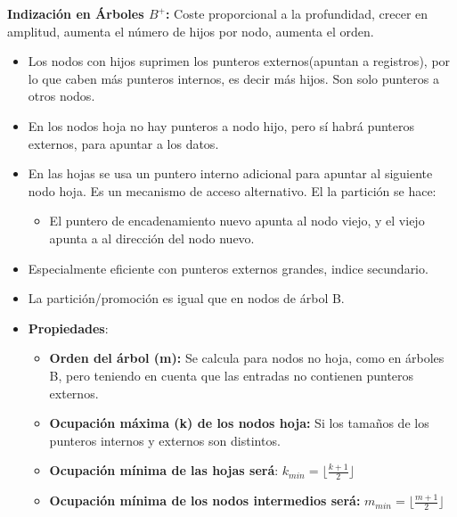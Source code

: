 \documentclass[12pt, twoside, openright]{report} %
\begin{document}
  
  \textbf{Indización en Árboles $B^+$:} Coste proporcional a la
  profundidad, crecer en amplitud, aumenta el número de hijos por nodo,
  aumenta el orden.
  

  \begin{itemize}
  \item Los nodos con hijos suprimen los punteros externos(apuntan a
    registros), por lo que caben más punteros internos, es decir más
    hijos. Son solo punteros a otros nodos.
    
  \item En los nodos hoja no hay punteros a nodo hijo, pero sí habrá
    punteros externos, para apuntar a los datos.
    
  \item En las hojas se usa un puntero interno adicional para apuntar al
    siguiente nodo hoja. Es un mecanismo de acceso alternativo. El la
    partición se hace:
    

    \begin{itemize}
    \item El puntero de encadenamiento nuevo apunta al nodo viejo, y el
      viejo apunta a al dirección del nodo nuevo.
      
    \end{itemize}
  \item Especialmente eficiente con punteros externos grandes, indice
    secundario.
    
  \item La partición/promoción es igual que en nodos de árbol B.
    
  \item \textbf{Propiedades}:
    

    \begin{itemize}
    \item \textbf{Orden del árbol (m):} Se calcula para nodos no hoja, como
      en árboles B, pero teniendo en cuenta que las entradas no
      contienen punteros externos.
      
    \item \textbf{Ocupación máxima (k) de los nodos hoja:} Si los tamaños de
      los punteros internos y externos son distintos.
      
    \item \textbf{Ocupación mínima de las hojas será}: $k_{min} = \lfloor \frac{k+1}{2} \rfloor$
      
    \item \textbf{Ocupación mínima de los nodos intermedios será:} $m_{min} = \lfloor \frac{m+1}{2} \rfloor$
      

\end{itemize}
\end{itemize}
\end{document}
